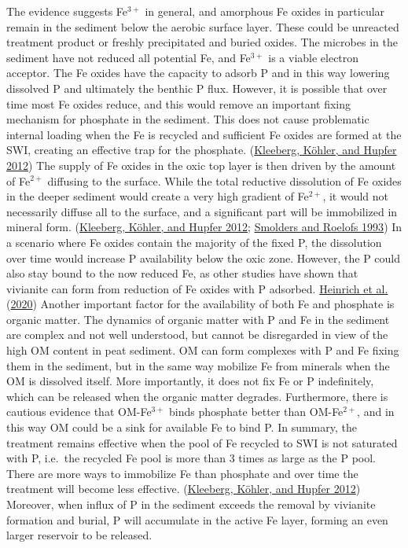 \documentclass[a4paper,11pt]{article}
\begin{document}
The evidence suggests Fe\(^{3+}\) in general, and amorphous Fe oxides in particular remain in the sediment below the aerobic surface layer. These could be unreacted treatment product or freshly precipitated and buried oxides. The microbes in the sediment have not reduced all potential Fe, and Fe\(^{3+}\) is a viable electron acceptor. The Fe oxides have the capacity to adsorb P and in this way lowering dissolved P and ultimately the benthic P flux. However, it is possible that over time most Fe oxides reduce, and this would remove an important fixing mechanism for phosphate in the sediment. This does not cause problematic internal loading when the Fe is recycled and sufficient Fe oxides are formed at the SWI, creating an effective trap for the phosphate. (\protect\hyperlink{ref-kleebergHowEffectivelyDoes2012}{Kleeberg, Köhler, and Hupfer 2012}) The supply of Fe oxides in the oxic top layer is then driven by the amount of Fe\(^{2+}\) diffusing to the surface. While the total reductive dissolution of Fe oxides in the deeper sediment would create a very high gradient of Fe\(^{2+}\), it would not necessarily diffuse all to the surface, and a significant part will be immobilized in mineral form. (\protect\hyperlink{ref-kleebergHowEffectivelyDoes2012}{Kleeberg, Köhler, and Hupfer 2012}; \protect\hyperlink{ref-smoldersSulphatemediatedIronLimitation1993}{Smolders and Roelofs 1993}) In a scenario where Fe oxides contain the majority of the fixed P, the dissolution over time would increase P availability below the oxic zone. However, the P could also stay bound to the now reduced Fe, as other studies have shown that vivianite can form from reduction of Fe oxides with P adsorbed. \protect\hyperlink{ref-heinrichTransformationRedoxsensitiveRedoxstable2020}{Heinrich et al.} (\protect\hyperlink{ref-heinrichTransformationRedoxsensitiveRedoxstable2020}{2020}) Another important factor for the availability of both Fe and phosphate is organic matter. The dynamics of organic matter with P and Fe in the sediment are complex and not well understood, but cannot be disregarded in view of the high OM content in peat sediment. OM can form complexes with P and Fe fixing them in the sediment, but in the same way mobilize Fe from minerals when the OM is dissolved itself. More importantly, it does not fix Fe or P indefinitely, which can be released when the organic matter degrades. Furthermore, there is cautious evidence that OM-Fe\(^{3+}\) binds phosphate better than OM-Fe\(^{2+}\), and in this way OM could be a sink for available Fe to bind P. In summary, the treatment remains effective when the pool of Fe recycled to SWI is not saturated with P, i.e.~the recycled Fe pool is more than 3 times as large as the P pool. There are more ways to immobilize Fe than phosphate and over time the treatment will become less effective. (\protect\hyperlink{ref-kleebergHowEffectivelyDoes2012}{Kleeberg, Köhler, and Hupfer 2012}) Moreover, when influx of P in the sediment exceeds the removal by vivianite formation and burial, P will accumulate in the active Fe layer, forming an even larger reservoir to be released.
\end{document}
